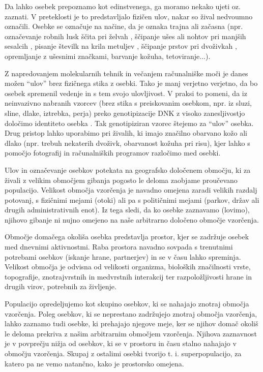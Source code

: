 Da lahko osebek prepoznamo kot edinstvenega, ga moramo nekako ujeti oz. zaznati. V preteklosti je to predstavljalo fizičen ulov, nakar so žival nedvoumno označili. Osebke se označuje na načine, da je oznaka trajna ali začasna (npr. označevanje robnih lusk ščita pri želvah \citep{pike2005}, ščipanje ušes ali nohtov pri manjših sesalcih \citep{wiewel_assessing_2007}, pisanje številk na krila metuljev \citep{jugovic_movement_2017}, ščipanje prstov pri dvoživkah \citep{campbell_evaluation_2009}, opremljanje z ušesnimi značkami, barvanje kožuha, tetoviranje...).

Z napredovanjem molekularnih tehnik in večanjem računalniške moči je danes možen “ulov” brez fizičnega stika z osebki. Tako je manj verjetno verjetno, da bo osebek spremenil vedenje in s tem svojo ulovljivost. V praksi to pomeni, da iz neinvazivno nabranih vzorcev (brez stika s preiskovanim osebkom, npr. iz sluzi, sline, dlake, iztrebka, perja) preko genotipizacije DNK z visoko zanesljivostjo določimo identiteto osebka \citep{waits_noninvasive_2005}. Tak genotipiziran vzorec štejemo za “ulov” osebka. Drug pristop lahko uporabimo pri živalih, ki imajo značilno obarvano kožo ali dlako (npr. trebuh nekaterih dvoživk, obarvanost kožuha pri risu), kjer lahko s pomočjo fotografij in računalniških programov razločimo med osebki.

Ulov in označevanje osebkov potekata na geografsko določenem območju, ki za živali z velikim območjem gibanja pogosto le deloma zaobjame proučevano populacijo. Velikost območja vzorčenja je navadno omejena zaradi velikih razdalj potovanj, s fizičnimi mejami (otoki) ali pa s političnimi mejami (parkov, držav ali drugih administrativnih enot). Iz tega sledi, da ko osebke zaznavamo (lovimo), njihovo gibanje ni nujno omejeno na naše arbitrarno določeno območje vzorčenja.

Območje domačega okoliša osebka predstavlja prostor, kjer se zadržuje osebek med dnevnimi aktivnostmi. Raba prostora navadno sovpada s trenutnimi potrebami osebkov (iskanje hrane, partnerjev) in se v času lahko spreminja. Velikost območja je odvisna od velikosti organizma, bioloških značilnosti vrste, topografije, znotrajvrstnih in medvrstnih interakcij ter razpoložljivosti hrane in drugih virov, potrebnih za življenje.

Populacijo opredeljujemo kot skupino osebkov, ki se nahajajo znotraj območja vzorčenja. Poleg osebkov, ki se neprestano zadržujejo znotraj območja vzorčenja, lahko zaznamo tudi osebke, ki prehajajo njegove meje, ker se njihov domač okoliš le deloma prekriva z našim arbitrarnim območjem vzorčenja. Njihova zaznavnost je v povprečju nižja od osebkov, ki se v prostoru in času stalno nahajajo v območju vzorčenja. Skupaj z ostalimi osebki tvorijo t. i. superpopulacijo, za katero pa ne vemo natančno, kako je prostorsko omejena.

